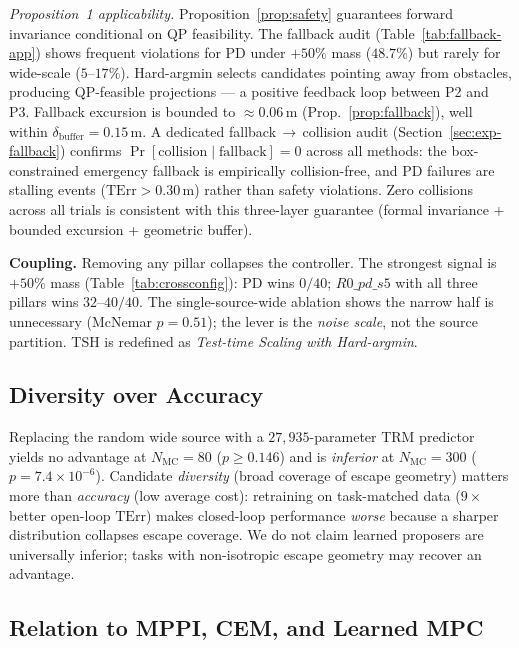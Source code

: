 \documentclass[11pt,onecolumn,a4paper]{article}
\newcommand{\Nm}{N_{\mathrm{MC}}}
\newcommand{\TErr}{\mathrm{TErr}}
\begin{document}
\emph{Proposition~1 applicability.}
Proposition~\ref{prop:safety} guarantees forward invariance conditional
on QP feasibility.  The fallback audit
(Table~\ref{tab:fallback-app}) shows frequent violations for PD under
$+50\%$ mass ($48.7\%$) but rarely for wide-scale ($5$--$17\%$).
Hard-argmin selects candidates pointing away from obstacles, producing
QP-feasible projections --- a positive feedback loop between P2 and P3.
Fallback excursion is bounded to ${\approx}0.06\,$m
(Prop.~\ref{prop:fallback}), well within $\delta_{\mathrm{buffer}} =
0.15\,$m.  A dedicated fallback$\,\to\,$collision audit
(Section~\ref{sec:exp-fallback}) confirms
$\Pr[\text{collision} \mid \text{fallback}] = 0$ across all methods:
the box-constrained emergency fallback is empirically collision-free,
and PD failures are stalling events ($\TErr > 0.30\,$m) rather than
safety violations.  Zero collisions across all trials is consistent
with this three-layer guarantee (formal invariance + bounded
excursion + geometric buffer).

\textbf{Coupling.} Removing any pillar collapses the controller.
The strongest signal is $+50\%$ mass (Table~\ref{tab:crossconfig}):
PD wins $0/40$; $R0\_pd\_s5$ with all three pillars wins $32$--$40/40$.
The single-source-wide ablation shows the narrow half is unnecessary
(McNemar $p = 0.51$); the lever is the \emph{noise scale}, not the
source partition. TSH is redefined as \emph{Test-time Scaling with
Hard-argmin}.

\subsection{Diversity over Accuracy}

Replacing the random wide source with a $27{,}935$-parameter TRM
predictor yields no advantage at $\Nm = 80$ ($p \ge 0.146$) and is
\emph{inferior} at $\Nm = 300$ ($p = 7.4 \times 10^{-6}$). Candidate
\emph{diversity} (broad coverage of escape geometry) matters more than
\emph{accuracy} (low average cost): retraining on task-matched data
($9\times$ better open-loop $\TErr$) makes closed-loop performance
\emph{worse} because a sharper distribution collapses escape coverage.
We do not claim learned proposers are universally inferior; tasks with
non-isotropic escape geometry may recover an advantage.

\subsection{Relation to MPPI, CEM, and Learned MPC}
\end{document}
